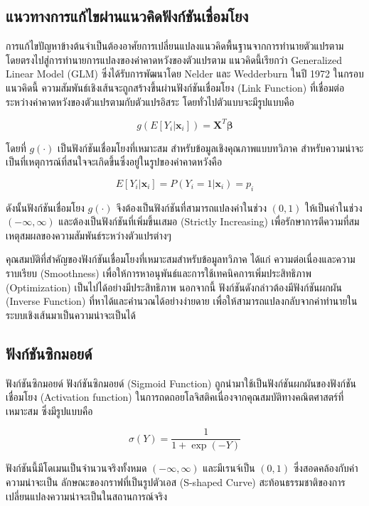 \subsection{แนวทางการแก้ไขผ่านแนวคิดฟังก์ชันเชื่อมโยง}

การแก้ไขปัญหาข้างต้นจำเป็นต้องอาศัยการเปลี่ยนแปลงแนวคิดพื้นฐานจากการทำนายตัวแปรตามโดยตรงไปสู่การทำนายการแปลงของค่าคาดหวังของตัวแปรตาม แนวคิดนี้เรียกว่า Generalized Linear Model (GLM) ซึ่งได้รับการพัฒนาโดย Nelder และ Wedderburn ในปี 1972 ในกรอบแนวคิดนี้ ความสัมพันธ์เชิงเส้นจะถูกสร้างขึ้นผ่านฟังก์ชันเชื่อมโยง (Link Function) ที่เชื่อมต่อระหว่างค่าคาดหวังของตัวแปรตามกับตัวแปรอิสระ โดยทั่วไปตัวแบบจะมีรูปแบบคือ 

$$g(E[Y_i|\mathbf{x}_i]) = \mathbf{X}^{T} \boldsymbol{\beta}$$

\noindent
โดยที่ $g(\cdot)$ เป็นฟังก์ชันเชื่อมโยงที่เหมาะสม สำหรับข้อมูลเชิงคุณภาพแบบทวิภาค สำหรับความน่าจะเป็นที่เหตุการณ์ที่สนใจจะเกิดขึ้นซึ่งอยู่ในรูปของค่าคาดหวังคือ  

$$E[Y_i|\mathbf{x}_i] = P(Y_i = 1|\mathbf{x}_i) = p_i$$ 

ดังนั้นฟังก์ชันเชื่อมโยง $g(\cdot)$ จึงต้องเป็นฟังก์ชันที่สามารถแปลงค่าในช่วง $(0, 1)$ ให้เป็นค่าในช่วง $(-\infty, \infty)$ และต้องเป็นฟังก์ชันที่เพิ่มขึ้นเสมอ (Strictly Increasing) เพื่อรักษาการตีความที่สมเหตุสมผลของความสัมพันธ์ระหว่างตัวแปรต่างๆ

คุณสมบัติที่สำคัญของฟังก์ชันเชื่อมโยงที่เหมาะสมสำหรับข้อมูลทวิภาค ได้แก่ ความต่อเนื่องและความราบเรียบ (Smoothness) เพื่อให้การหาอนุพันธ์และการใช้เทคนิคการเพิ่มประสิทธิภาพ (Optimization) เป็นไปได้อย่างมีประสิทธิภาพ นอกจากนี้ ฟังก์ชันดังกล่าวต้องมีฟังก์ชันผกผัน (Inverse Function) ที่หาได้และคำนวณได้อย่างง่ายดาย เพื่อให้สามารถแปลงกลับจากค่าทำนายในระบบเชิงเส้นมาเป็นความน่าจะเป็นได้

\subsection{ฟังก์ชันซิกมอยด์}
\begin{myBox}[]{ฟังก์ชันซิกมอยด์}{}
ฟังก์ชันซิกมอยด์ (Sigmoid Function) ถูกนำมาใช้เป็นฟังก์ชันผกผันของฟังก์ชันเชื่อมโยง (Activation function) ในการถดถอยโลจิสติคเนื่องจากคุณสมบัติทางคณิตศาสตร์ที่เหมาะสม  ซึ่งมีรูปแบบคือ

$$\sigma(Y) = \frac{1}{1 + \exp(-Y)}$$

ฟังก์ชันนี้มีโดเมนเป็นจำนวนจริงทั้งหมด $(-\infty, \infty)$ และมีเรนจ์เป็น $(0, 1)$ ซึ่งสอดคล้องกับค่าความน่าจะเป็น ลักษณะของกราฟที่เป็นรูปตัวเอส (S-shaped Curve) สะท้อนธรรมชาติของการเปลี่ยนแปลงความน่าจะเป็นในสถานการณ์จริง
\end{myBox}

